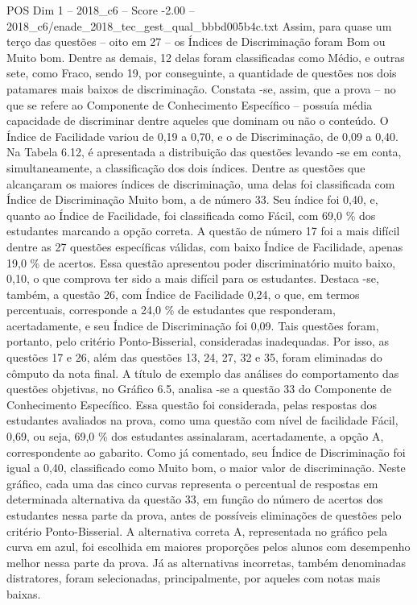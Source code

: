 \begin{textsample}{POS Dim 1 – 2018\_c6 – Score -2.00 – 2018\_c6/enade\_2018\_tec\_gest\_qual\_bbbd005b4c.txt}
Assim, para quase um terço das questões – oito em 27 – os Índices de Discriminação foram Bom ou Muito bom.
Dentre as demais, 12 delas foram classificadas como Médio, e outras sete, como Fraco, sendo 19, por conseguinte, a quantidade de questões nos dois patamares mais baixos de discriminação.
Constata -se, assim, que a prova – no que se refere ao Componente de Conhecimento Específico – possuía média capacidade de discriminar dentre aqueles que dominam ou não o conteúdo.
O Índice de Facilidade variou de 0,19 a 0,70, e o de Discriminação, de 0,09 a 0,40.
Na Tabela 6.12, é apresentada a distribuição das questões levando -se em conta, simultaneamente, a classificação dos dois índices.
Dentre as questões que alcançaram os maiores índices de discriminação, uma delas foi classificada com Índice de Discriminação Muito bom, a de número 33.
Seu índice foi 0,40, e, quanto ao Índice de Facilidade, foi classificada como Fácil, com 69,0 \% dos estudantes marcando a opção correta.
A questão de número 17 foi a mais difícil dentre as 27 questões específicas válidas, com baixo Índice de Facilidade, apenas 19,0 \% de acertos.
Essa questão apresentou poder discriminatório muito baixo, 0,10, o que comprova ter sido a mais difícil para os estudantes.
Destaca -se, também, a questão 26, com Índice de Facilidade 0,24, o que, em termos percentuais, corresponde a 24,0 \% de estudantes que responderam, acertadamente, e seu Índice de Discriminação foi 0,09.
Tais questões foram, portanto, pelo critério Ponto-Bisserial, consideradas inadequadas.
Por isso, as questões 17 e 26, além das questões 13, 24, 27, 32 e 35, foram eliminadas do cômputo da nota final.
A título de exemplo das análises do comportamento das questões objetivas, no Gráfico 6.5, analisa -se a questão 33 do Componente de Conhecimento Específico.
Essa questão foi considerada, pelas respostas dos estudantes avaliados na prova, como uma questão com nível de facilidade Fácil, 0,69, ou seja, 69,0 \% dos estudantes assinalaram, acertadamente, a opção A, correspondente ao gabarito.
Como já comentado, seu Índice de Discriminação foi igual a 0,40, classificado como Muito bom, o maior valor de discriminação.
Neste gráfico, cada uma das cinco curvas representa o percentual de respostas em determinada alternativa da questão 33, em função do número de acertos dos estudantes nessa parte da prova, antes de possíveis eliminações de questões pelo critério Ponto-Bisserial.
A alternativa correta A, representada no gráfico pela curva em azul, foi escolhida em maiores proporções pelos alunos com desempenho melhor nessa parte da prova.
Já as alternativas incorretas, também denominadas distratores, foram selecionadas, principalmente, por aqueles com notas mais baixas.

\end{textsample}
